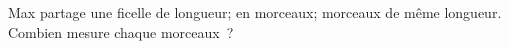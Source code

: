 \documentclass[exercice]{thedocument}%
\begin{document}
%
Max partage une ficelle de \<longueur; en \<morceaux; morceaux de même longueur.\vskip5pt Combien
mesure chaque morceaux~?
\end{document}
